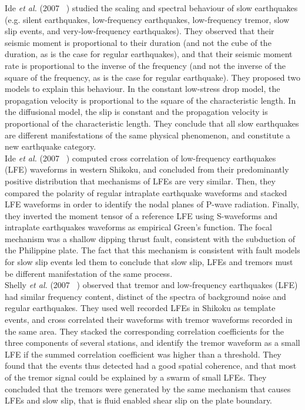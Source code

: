 \documentclass[main.tex]{subfiles}
\begin{document}
Ide \textit{et al.} (2007 ~\cite{IDE_2007_nature}) studied the scaling and spectral behaviour of slow earthquakes (e.g. silent earthquakes, low-frequency earthquakes, low-frequency tremor, slow slip events, and very-low-frequency earthquakes). They observed that their seismic moment is proportional to their duration (and not the cube of the duration, as is the case for regular earthquakes), and that their seismic moment rate is proportional to the inverse of the frequency (and not the inverse of the square of the frequency, as is the case for regular earthquake). They proposed two models to explain this behaviour. In the constant low-stress drop model, the propagation velocity is proportional to the square of the characteristic length. In the diffusional model, the slip is constant and the propagation velocity is proportional of the characteristic length. They conclude that all slow earthquakes are different manifestations of the same physical phenomenon, and constitute a new earthquake category. \\

Ide \textit{et al.} (2007 ~\cite{IDE_2007_GRL}) computed cross correlation of low-frequency earthquakes (LFE) waveforms in western Shikoku, and concluded from their predominantly positive distribution that mechanisms of LFEs are very similar. Then, they compared the polarity of regular intraplate earthquake waveforms and stacked LFE waveforms in order to identify the nodal planes of P-wave radiation. Finally, they inverted the moment tensor of a reference LFE using S-waveforms and intraplate earthquakes waveforms as empirical Green's function. The focal mechanism was a shallow dipping thrust fault, consistent with the subduction of the Philippine plate. The fact that this mechanism is consistent with fault models for slow slip events led them to conclude that slow slip, LFEs and tremors must be different manifestation of the same process. \\

Shelly \textit{et al.} (2007 ~\cite{SHE_2007_nature}) observed that tremor and low-frequency earthquakes (LFE) had similar frequency content, distinct of the spectra of background noise and regular earthquakes. They used well recorded LFEs in Shikoku as template events, and cross correlated their waveforms with tremor waveforms recorded in the same area. They stacked the corresponding correlation coefficients for the three components of several stations, and identify the tremor waveform as a small LFE if the summed correlation coefficient was higher than a threshold. They found that the events thus detected had a good spatial coherence, and that most of the tremor signal could be explained by a swarm of small LFEs. They concluded that the tremors were generated by the same mechanism that causes LFEs and slow slip, that is fluid enabled shear slip on the plate boundary. \\
\end{document}
